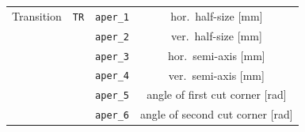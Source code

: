\begin{center}
\begin{longtable}{|c|c|c|c|}
    Transition & \texttt{TR} & \texttt{aper\_1} & hor.~half-size [mm] \\*
    & & \texttt{aper\_2} & ver.~half-size [mm] \\*
    & & \texttt{aper\_3} & hor.~semi-axis [mm] \\*
    & & \texttt{aper\_4} & ver.~semi-axis [mm] \\*
    & & \texttt{aper\_5} & angle of first cut corner [rad] \\*
    & & \texttt{aper\_6} & angle of second cut corner [rad] \\*
    \hline

\end{longtable}
\end{center}

